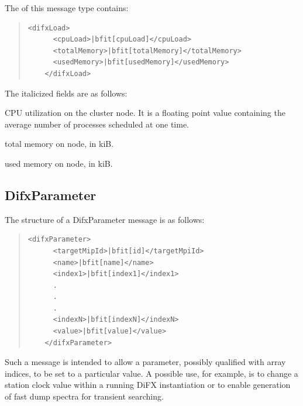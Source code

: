 \begin{description}
The  of this message type contains:

\begin{quotation}
\begin{Verbatim}[commandchars=\|\[\]]
    <difxLoad>
      <cpuLoad>|bfit[cpuLoad]</cpuLoad>
      <totalMemory>|bfit[totalMemory]</totalMemory>
      <usedMemory>|bfit[usedMemory]</usedMemory>
    </difxLoad>
\end{Verbatim}
\end{quotation}

\noindent The italicized fields are as follows:

\begin{description}
\item{} CPU utilization on the cluster node.  
It is a floating point value containing the average number of processes scheduled at one time.
\item{} total memory on node, in kiB.
\item{} used memory on node, in kiB.
\end{description}







\subsection{DifxParameter}

The structure of a DifxParameter message  is as follows:

\begin{quotation} 
\begin{Verbatim}[commandchars=\|\[\]] 
    <difxParameter>
      <targetMipId>|bfit[id]</targetMpiId>
      <name>|bfit[name]</name>
      <index1>|bfit[index1]</index1>
      .
      .
      .
      <indexN>|bfit[indexN]</indexN>
      <value>|bfit[value]</value>
    </difxParameter>
\end{Verbatim}
\end{quotation}

Such a message is intended to allow a parameter, possibly qualified with array indices, to be set to a particular value.
A possible use, for example, is to change a station clock value within a running DiFX instantiation or to enable generation of fast dump spectra for transient searching.


\end{description}
